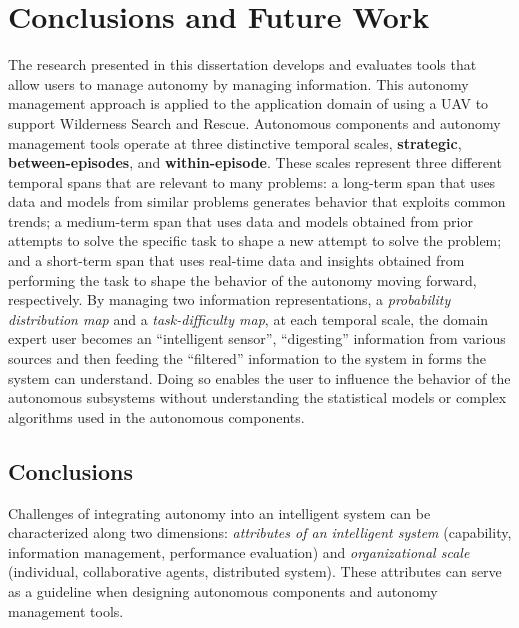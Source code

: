 \chapter[Conclusions and Future Work]{Conclusions and Future Work}
\label{chap:Conclusions}

The research presented in this dissertation develops and evaluates tools that allow users to manage autonomy by managing information. This autonomy management approach is applied to the application domain of using a UAV to support Wilderness Search and Rescue. Autonomous components and autonomy management tools operate at three distinctive temporal scales, \textbf{strategic}, \textbf{between-episodes}, and \textbf{within-episode}. These scales represent three different temporal spans that are relevant to many problems: a long-term span that uses data and models from similar problems generates behavior that exploits common trends; a medium-term span that uses data and models obtained from prior attempts to solve the specific task to shape a new attempt to solve the problem; and a short-term span that uses real-time data and insights obtained from performing the task to shape the behavior of the autonomy moving forward, respectively. By managing two information representations, a \textit{probability distribution map} and a \textit{task-difficulty map}, at each temporal scale, the domain expert user becomes an ``intelligent sensor'', ``digesting'' information from various sources and then feeding the ``filtered'' information to the system in forms the system can understand. Doing so enables the user to influence the behavior of the autonomous subsystems without understanding the statistical models or complex algorithms used in the autonomous components.

\section{Conclusions}
\label{conclusions}

Challenges of integrating autonomy into an intelligent system can be characterized along two dimensions: \textit{attributes of an intelligent system} (capability, information management, performance evaluation) and \textit{organizational scale} (individual, collaborative agents, distributed system). These attributes can serve as a guideline when designing autonomous components and autonomy management tools. 

